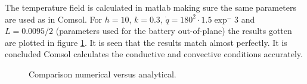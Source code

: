 The temperature field is calculated in matlab making sure the same parameters are used as in Comsol. For $h = 10$, $k = 0.3$, $\dot{q} = 180^2\cdot 1.5 \exp^-3$ and $L = 0.0095/2$ (parameters used for the battery out-of-plane) the results gotten are plotted in figure \ref{Fig:Comparison}. It is seen that the results match almost perfectly. It is concluded Comsol calculates the conductive and convective conditions accurately.

\begin{figure}[H]
  \centering
  \hfill
  \caption{Comparison numerical versus analytical.}
  \label{Fig:Comparison}
\end{figure}










\newpage